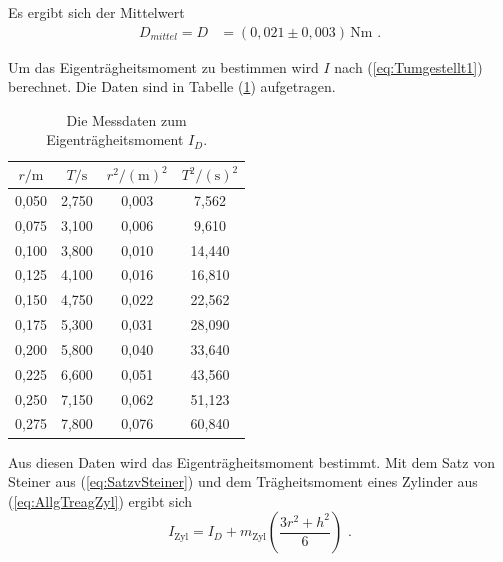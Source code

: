 Es ergibt sich der Mittelwert
\begin{align*}
  D_{mittel} = D  & = (0,021 \pm 0,003) \, \unit{\newton\meter} \text{ .}
\end{align*}

Um das Eigenträgheitsmoment zu bestimmen wird $I$ nach (\ref{eq:Tumgestellt1}) berechnet.
Die Daten sind in Tabelle (\ref{tab:Eigenträgheitsmoment}) aufgetragen.

\begin{table}
  \centering
  \caption{Die Messdaten zum Eigenträgheitsmoment $I_{D}$.}
  \label{tab:Eigenträgheitsmoment}
  \begin{tabular}{c c c c}
    \toprule
    $r / \unit\meter$  &  $T / \unit\second$ & $r^2 / (\unit\meter)^2$  & $T^2 / (\unit\second)^2$\\
    \midrule
      0,050   & 2,750   & 0,003   &  7,562  \\
      0,075   & 3,100   & 0,006   &  9,610  \\
      0,100   & 3,800   & 0,010   & 14,440  \\
      0,125   & 4,100   & 0,016   & 16,810  \\
      0,150   & 4,750   & 0,022   & 22,562  \\
      0,175   & 5,300   & 0,031   & 28,090  \\
      0,200   & 5,800   & 0,040   & 33,640  \\
      0,225   & 6,600   & 0,051   & 43,560  \\
      0,250   & 7,150   & 0,062   & 51,123  \\
      0,275   & 7,800   & 0,076   & 60,840  \\
    \bottomrule
    \end{tabular}
\end{table}

Aus diesen Daten wird das Eigenträgheitsmoment bestimmt.
Mit dem Satz von Steiner aus (\ref{eq:SatzvSteiner}) und dem Trägheitsmoment eines Zylinder aus (\ref{eq:AllgTreagZyl}) ergibt sich
\begin{equation} \label{eq:IZyl}
  I_{\text{Zyl}} = I_{D} + m_{\text{Zyl}}  \left( \frac{3 r^2 + h^2}{6} \right) \text{ .}
\end{equation}

